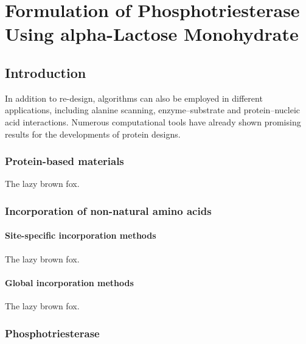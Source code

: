 \chapter{Formulation of Phosphotriesterase Using alpha-Lactose Monohydrate} 
\label{chap:lactose}

\begin{refsection}

\section{Introduction}

In addition to re-design, algorithms can also be employed in different
applications, including alanine scanning\cite{Massova1999,Kortemme2004a},
enzyme–substrate\cite{Bolon2001,Jiang2008} and protein–nucleic acid
interactions\cite{Ashworth2006}. Numerous computational tools have already
shown promising results for the developments of protein designs. 


\subsection{Protein-based materials}

The lazy brown fox.

\subsection{Incorporation of non-natural amino acids}

\subsubsection{Site-specific incorporation methods}

The lazy brown fox.

\subsubsection{Global incorporation methods}

The lazy brown fox.

\subsection{Phosphotriesterase}


\end{refsection}
